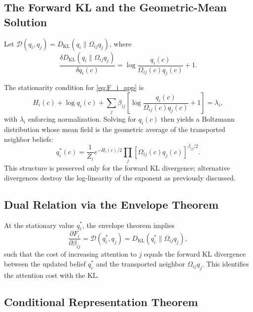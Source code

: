 \documentclass[11pt]{article}
\begin{document}
\subsection*{The Forward KL and the Geometric-Mean Solution}

Let $\mathcal{D}(q_i,q_j) = D_{\mathrm{KL}}(q_i \| \Omega_{ij} q_j)$, where
\[
\frac{\delta D_{\mathrm{KL}}(q_i \| \Omega_{ij} q_j)}{\delta q_i(c)}
= \log\frac{q_i(c)}{\Omega_{ij}(c) q_j(c)} + 1.
\]

The stationarity condition for \eqref{eq:F_i_app} is
\begin{equation}
H_i(c)
+ \log q_i(c)
+ \sum_j \beta_{ij}
\left[
\log\frac{q_i(c)}{\Omega_{ij}(c)q_j(c)}+1
\right]
= \lambda_i,
\end{equation}
with $\lambda_i$ enforcing normalization. Solving for $q_i(c)$ then yields a Boltzmann distribution whose mean field is the geometric average of the transported neighbor beliefs:
\begin{equation}
q_i^*(c)
= \frac{1}{Z_i}
e^{-H_i(c)/2}
\prod_j
[\Omega_{ij}(c) q_j(c)]^{\beta_{ij}/2}.
\end{equation}
This structure is preserved only for the forward KL divergence; alternative divergences destroy the log-linearity of the exponent as previously discussed.

\subsection*{Dual Relation via the Envelope Theorem}

At the stationary value $q_i^*$, the envelope theorem implies
\begin{equation}
\frac{\partial F_i}{\partial \beta_{ij}}
= \mathcal{D}(q_i^*, q_j)
= D_{\mathrm{KL}}(q_i^* \| \Omega_{ij} q_j),
\end{equation}
such that the cost of increasing attention to $j$ equals the forward KL divergence between the updated belief $q_i^*$ and the transported neighbor $\Omega_{ij} q_j$. This identifies the attention cost with the KL.

\subsection*{Conditional Representation Theorem}
\end{document}
